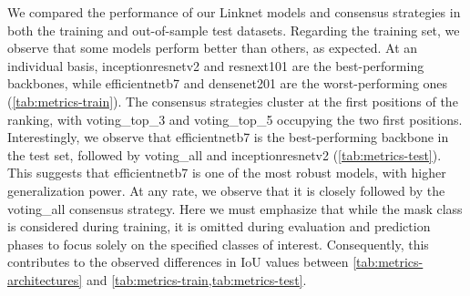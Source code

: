 We compared the performance of our Linknet models and consensus strategies
in both the training and out-of-sample test datasets. Regarding the training
set, we observe that some models perform better than others, as expected. At an
individual basis, inceptionresnetv2 and resnext101 are the best-performing
backbones, while efficientnetb7 and densenet201 are the worst-performing ones
(\cref{tab:metrics-train}). The consensus strategies cluster at the first
positions of the ranking, with voting\_top\_3 and voting\_top\_5 occupying the
two first positions. Interestingly, we observe that efficientnetb7 is the
best-performing backbone in the test set, followed by voting\_all and
inceptionresnetv2 (\cref{tab:metrics-test}). This suggests that efficientnetb7
is one of the most robust models, with higher generalization power. At any
rate, we observe that it is closely followed by the voting\_all consensus
strategy. Here we must emphasize that while the mask class is considered during
training, it is omitted during evaluation and prediction phases to focus solely
on the specified classes of interest. Consequently, this contributes to the
observed differences in IoU values between \cref{tab:metrics-architectures} and
\cref{tab:metrics-train,tab:metrics-test}.

